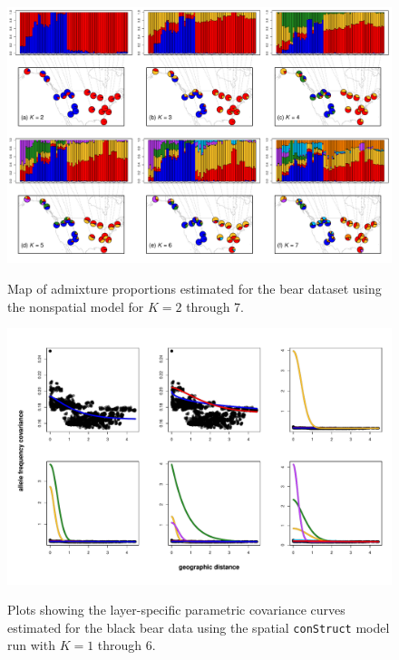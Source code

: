 \documentclass[10pt,letterpaper]{article}
\begin{document}
\begin{figure}
	\centering
		{\includegraphics[width=\textwidth]{figs/bears/bear_nsp_results.pdf}}
	\caption{
	Map of admixture proportions estimated for the bear dataset 
	using the nonspatial model for $K=2$ through 7.
    }\label{bear_nsp_pies}
\end{figure}

\begin{figure}
	\centering
		{\includegraphics[width=\textwidth]{figs/bears/bear_sp_layer_covs.pdf}}
	\caption{
	Plots showing the layer-specific parametric covariance curves 
	estimated for the black bear data using 
	the spatial \texttt{conStruct} model run with $K=1$ through 6.
	 }\label{bear_sp_layer_covs}
\end{figure}
\end{document}
